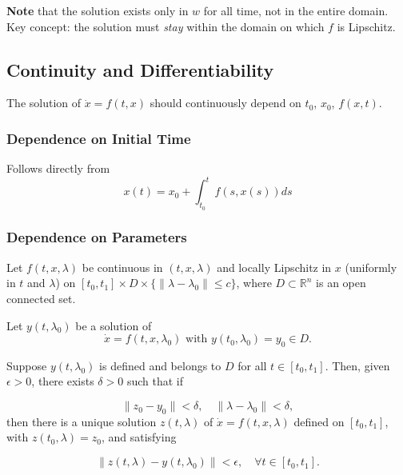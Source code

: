 \textbf{Note} that the solution exists only in $w$ for all time, not in the entire domain. Key concept: the solution must \textit{stay} within the domain on which $f$ is Lipschitz.

\subsection{Continuity and Differentiability}

The solution of $\dot{x} = f(t, x)$ should continuously depend on $t_0$, $x_0$, $f(x,t)$.

\subsubsection{Dependence on Initial Time}

Follows directly from
\noindent\begin{equation*}
    x\left(t\right)=x_0+\int_{t_0}^t f\left(s,x\left(s\right)\right)ds
\end{equation*}

\subsubsection{Dependence on Parameters}

Let $f (t, x, \lambda)$ be continuous in $(t, x, \lambda)$ and locally Lipschitz in $x$ (uniformly in $t$ and $\lambda$) on $[t_0, t_1] \times D \times \{\|\lambda - \lambda_0\| \leq c\}$, where $D \subset \mathbb{R}^n$ is an open connected set.

Let $y (t, \lambda_0)$ be a solution of
\noindent\begin{equation*}
    \dot{x} = f (t, x, \lambda_0) \text{ with } y (t_0, \lambda_0) = y_0 \in D.
\end{equation*}

Suppose $y (t, \lambda_0)$ is defined and belongs to $D$ for all $t \in [t_0, t_1]$. Then, given $\epsilon > 0$, there exists $\delta > 0$ such that if

\noindent\begin{equation*}
    \|z_0 - y_0\| < \delta, \quad \|\lambda - \lambda_0\| < \delta,
\end{equation*}
then there is a unique solution $z (t, \lambda)$ of $\dot{x} = f (t, x, \lambda)$ defined on $[t_0, t_1]$, with $z (t_0, \lambda) = z_0$, and satisfying

\noindent\begin{equation*}
    \|z (t, \lambda) - y (t, \lambda_0)\| < \epsilon, \quad \forall t \in [t_0, t_1].
\end{equation*}

